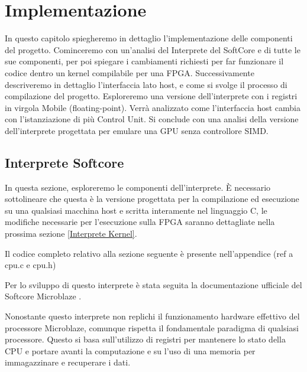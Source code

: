 \chapter{Implementazione}
\label{implementazione}

In questo capitolo spiegheremo in dettaglio l'implementazione delle componenti del progetto. Cominceremo con un'analisi del Interprete del SoftCore e di tutte le sue componenti, per poi spiegare i cambiamenti richiesti per far funzionare il codice dentro un kernel compilabile per una FPGA. Successivamente descriveremo in dettaglio l'interfaccia lato host, e come si svolge il processo di compilazione del progetto. Esploreremo una versione dell'interprete con i registri in virgola Mobile (floating-point).
Verrà analizzato come l'interfaccia host cambia con l'istanziazione di più Control Unit.
Si conclude con una analisi della versione dell'interprete progettata per emulare una GPU senza controllore SIMD.

\clearpage

\section{Interprete Softcore}
\label{Interprete Softcore}
In questa sezione, esploreremo le componenti dell'interprete.
È necessario sottolineare che questa è la versione progettata per la compilazione ed esecuzione su una qualsiasi macchina host e scritta interamente nel linguaggio C, le modifiche necessarie per l'esecuzione sulla FPGA saranno dettagliate nella prossima sezione \ref{Interprete Kernel}.

\vspace{0.5cm}

\noindent Il codice completo relativo alla sezione seguente è presente nell'appendice (ref a cpu.c e cpu.h)

\vspace{0.5cm}

Per lo sviluppo di questo interprete è stata seguita la documentazione ufficiale del Softcore Microblaze \cite{sitoMicroblaze}.

\vspace{0.5cm}

Nonostante questo interprete non replichi il funzionamento hardware effettivo del processore Microblaze, comunque rispetta il fondamentale paradigma di qualsiasi processore. Questo si basa sull'utilizzo di registri per mantenere lo stato della CPU e portare avanti la computazione e su l'uso di una memoria per immagazzinare e recuperare i dati.

